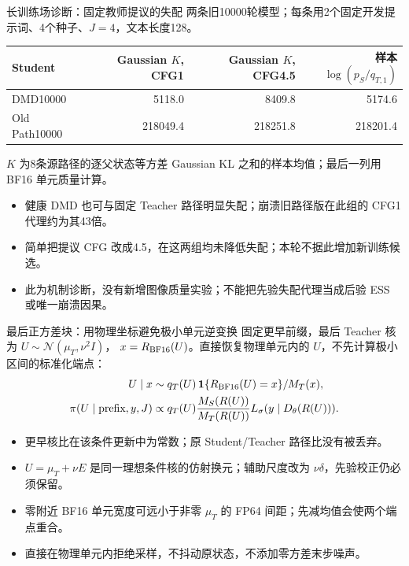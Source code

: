 \documentclass[10pt,aspectratio=169]{beamer}
\newcommand{\N}{\mathcal N}
\begin{document}
\begin{frame}{长训练场诊断：固定教师提议的失配}
\scriptsize\centering
两条旧10000轮模型；每条用2个固定开发提示词、4个种子、$J=4$，文本长度128。
\begin{tabular}{lrrr}\toprule
Student & Gaussian $K$, CFG1 & Gaussian $K$, CFG4.5 & 样本$\log(p_S/q_{T,1})$\\\midrule
DMD10000 & 5118.0 & 8409.8 & 5174.6 \\
Old Path10000 & 218049.4 & 218251.8 & 218201.4 \\
\bottomrule\end{tabular}\par\raggedright\vspace{5pt}
$K$ 为8条源路径的逐父状态等方差 Gaussian KL 之和的样本均值；最后一列用 BF16 单元质量计算。
\begin{itemize}\itemsep4pt
\item 健康 DMD 也可与固定 Teacher 路径明显失配；崩溃旧路径版在此组的 CFG1 代理约为其43倍。
\item 简单把提议 CFG 改成4.5，在这两组均未降低失配；本轮不据此增加新训练候选。
\item 此为机制诊断，没有新增图像质量实验；不能把先验失配代理当成后验 ESS 或唯一崩溃因果。
\end{itemize}
\end{frame}
\begin{frame}{最后正方差块：用物理坐标避免极小单元逆变换}
\small
固定更早前缀，最后 Teacher 核为 $U\sim\N(\mu_T,\nu^2I)$，
$x=R_{\rm BF16}(U)$。直接恢复物理单元内的 $U$，不先计算极小区间的标准化端点：
\begin{align}
U\mid x&\sim q_T(U)\,\mathbf1\{R_{\rm BF16}(U)=x\}/M_T(x),\\
\pi(U\mid\text{prefix},y,J)&\propto q_T(U)
\frac{M_S(R(U))}{M_T(R(U))}L_\sigma(y\mid D_\theta(R(U))).
\end{align}
\begin{itemize}\itemsep5pt
\item 更早核比在该条件更新中为常数；原 Student/Teacher 路径比没有被丢弃。
\item $U=\mu_T+\nu E$ 是同一理想条件核的仿射换元；辅助尺度改为 $\nu\delta$，先验校正仍必须保留。
\item 零附近 BF16 单元宽度可远小于非零 $\mu_T$ 的 FP64 间距；先减均值会使两个端点重合。
\item 直接在物理单元内拒绝采样，不抖动原状态，不添加零方差末步噪声。
\end{itemize}
\end{frame}
\end{document}
